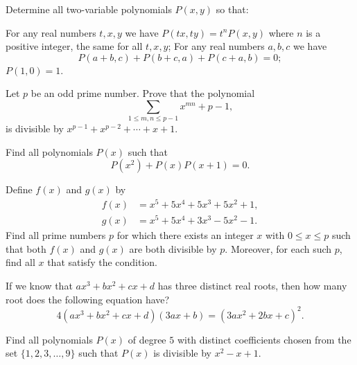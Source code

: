 \begin{question}[name={1975 International Mathematics Olympiad}]
    Determine all two-variable polynomials $P(x,y)$ so that:
    \begin{tasks}
        \task For any real numbers $t,x,y$ we have $P(tx,ty) = t^n P(x,y)$ where $n$ is a positive integer, the same for all $t,x,y$;
        \task For any real numbers $a,b,c$ we have \[P(a + b,c) + P(b + c,a) + P(c + a,b) = 0;\]
        \task $P(1,0) =1$.
    \end{tasks}
\end{question}


\begin{question}
    Let $p$ be an odd prime number. Prove that the polynomial
    \[\sum_{1 \leq m,n \leq p-1} x^{mn} + p -1,\]
    is divisible by $x^{p-1} + x^{p-2} + \cdots + x + 1$.
\end{question}

\begin{question}
    Find all polynomials $P(x)$ such that
    \[P(x^2) + P(x)P(x+1)=0.\]
\end{question}

\begin{question}[name={1997 Germany}]
    Define $f(x)$ and $g(x)$ by
    \begin{align*}
        f(x) &= x^5 + 5x^4 + 5x^3 + 5x^2 + 1,\\
        g(x) &= x^5 + 5x^4 + 3x^3 - 5x^2 - 1.
    \end{align*}
    Find all prime numbers $p$ for which there exists an integer $x$ with $0 \leq x \leq p$ such that both $f(x)$ and $g(x)$ are both divisible by $p$. Moreover, for each such $p$, find all $x$ that satisfy the condition.
\end{question}


\begin{question}[name={1997 Ukraine}]
    If we know that $ax^3+bx^2+cx+d$ has three distinct real roots, then how many root does the following equation have?
    \[4(ax^3+bx^2+cx+d)(3ax+b) = (3ax^2+2bx+c)^2.\]
\end{question}

\begin{question}[name={1997 British Math Olympiad}]
    Find all polynomials $P(x)$ of degree $5$ with distinct coefficients chosen from the set $\{1,2,3,\dots,9\}$ such that $P(x)$ is divisible by $x^2-x+1$.
\end{question}


